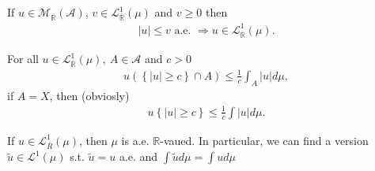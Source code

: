 \begin{corollary}
    If \(u\in\mathcal{M}_{\overline{\mathbb{R}}}(\mathscr{A})\), \(v\in\mathcal{L}^{1}_{\overline{\mathbb{R}}}(\mu)\) and \(v\geq0\) then
    \begin{align}
        \vert u\vert \leq v \text{ a.e. } \Rightarrow u\in\mathcal{L}^{1}_{\overline{\mathbb{R}}}(\mu).
    \end{align}
\end{corollary}
\begin{proposition}
    For all \(u\in\mathcal{L}^{1}_{\overline{\mathbb{R}}}(\mu), \ A\in\mathscr{A}\) and \(c>0\)
    \begin{align}
        u\left(\left\{ \vert u\vert \geq c \right\} \cap A\right) \leq \frac{1}{c}\int_{A}\vert u\vert d\mu,
    \end{align}
    if \(A=X\), then (obviosly)
    \begin{align}
        u\left\{ \vert u\vert \geq c \right\} \leq \frac{1}{c}\int \vert u\vert d\mu.
    \end{align}
\end{proposition}    
\ifdetailed
\begin{corollary}
    If \(u\in\mathcal{L}^{1}_{\overline{R}}(\mu)\), then \(\mu\) is a.e. \(\mathbb{R}\)-vaued. In particular, we can find a version
    \(\tilde{u}\in \mathcal{L}^{1}(\mu)\) s.t. \(\tilde{u}=u\) a.e. and \(\int\tilde{u}d\mu = \int ud\mu\)
\end{corollary}
\fi